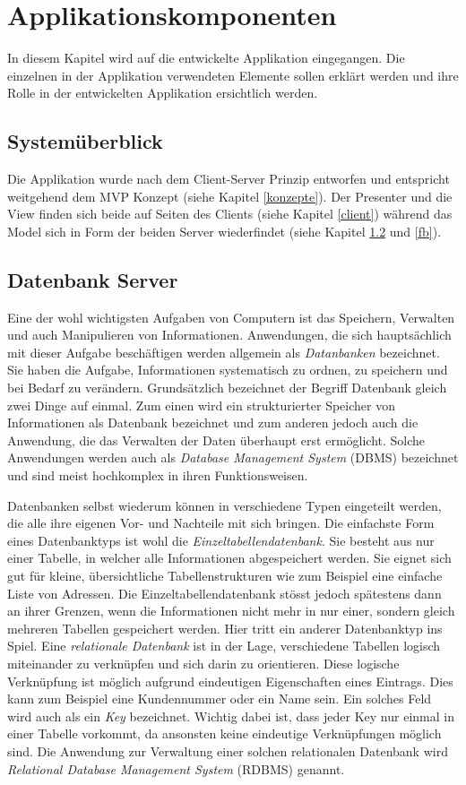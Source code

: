 \documentclass[a4paper,11pt]{report}
\begin{document}
	\chapter{Applikationskomponenten}
	In diesem Kapitel wird auf die entwickelte Applikation eingegangen. Die einzelnen in der Applikation verwendeten Elemente sollen erklärt werden und ihre Rolle in der entwickelten Applikation ersichtlich werden.
		\section{Systemüberblick}
		Die Applikation wurde nach dem Client-Server Prinzip entworfen und entspricht weitgehend dem MVP Konzept (siehe Kapitel \ref{konzepte}). Der Presenter und die View finden sich beide auf Seiten des Clients (siehe Kapitel \ref{client}) während das Model sich in Form der beiden Server wiederfindet (siehe Kapitel \ref{server} und \ref{fb}).
		
			\section{Datenbank Server} \label{server}
			Eine der wohl wichtigsten Aufgaben von Computern ist das Speichern, Verwalten und auch Manipulieren von Informationen. Anwendungen, die sich hauptsächlich mit dieser Aufgabe beschäftigen werden allgemein als \emph{Datanbanken} bezeichnet. Sie haben die Aufgabe, Informationen systematisch zu ordnen, zu speichern und bei Bedarf zu verändern. Grundsätzlich bezeichnet der Begriff Datenbank gleich zwei Dinge auf einmal. Zum einen wird ein strukturierter Speicher von Informationen als Datenbank bezeichnet und zum anderen jedoch auch die Anwendung, die das Verwalten der Daten überhaupt erst ermöglicht. Solche Anwendungen werden auch als \emph{Database Management System} (DBMS) bezeichnet und sind meist hochkomplex in ihren Funktionsweisen. \cite{IT-Handbuch}
			
			Datenbanken selbst wiederum können in  verschiedene Typen eingeteilt werden, die alle ihre eigenen Vor- und Nachteile mit sich bringen. Die einfachste Form eines Datenbanktyps ist wohl die \emph{Einzeltabellendatenbank}. Sie besteht aus nur einer Tabelle, in welcher alle Informationen abgespeichert werden. Sie eignet sich gut für kleine, übersichtliche Tabellenstrukturen wie zum Beispiel eine einfache Liste von Adressen. Die Einzeltabellendatenbank stösst jedoch spätestens dann an ihrer Grenzen, wenn die Informationen nicht mehr in nur einer, sondern gleich mehreren Tabellen gespeichert werden. Hier tritt ein anderer Datenbanktyp ins Spiel. Eine \emph{relationale Datenbank} ist in der Lage, verschiedene Tabellen logisch miteinander zu verknüpfen und sich darin zu orientieren. Diese logische Verknüpfung ist möglich aufgrund eindeutigen Eigenschaften eines Eintrags. Dies kann zum Beispiel eine Kundennummer oder ein Name sein. Ein solches Feld wird auch als ein \emph{Key} bezeichnet. Wichtig dabei ist, dass jeder Key nur einmal in einer Tabelle vorkommt, da ansonsten keine eindeutige Verknüpfungen möglich sind. Die Anwendung zur Verwaltung einer solchen relationalen Datenbank wird \emph{Relational Database Management System} (RDBMS) genannt. \cite[S. 745 - 751]{IT-Handbuch}
\end{document}
